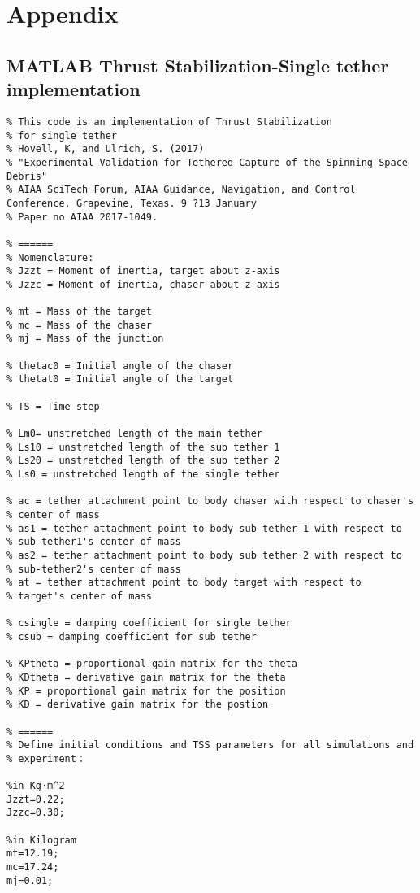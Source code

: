 \chapter{Appendix}\label{section-appendix} 
\section{MATLAB Thrust Stabilization-Single tether implementation}
\begin{lstlisting}
% This code is an implementation of Thrust Stabilization
% for single tether
% Hovell, K, and Ulrich, S. (2017)
% "Experimental Validation for Tethered Capture of the Spinning Space Debris"
% AIAA SciTech Forum, AIAA Guidance, Navigation, and Control Conference, Grapevine, Texas. 9 ?13 January
% Paper no AIAA 2017-1049.

% ======
% Nomenclature:
% Jzzt = Moment of inertia, target about z-axis 
% Jzzc = Moment of inertia, chaser about z-axis

% mt = Mass of the target
% mc = Mass of the chaser
% mj = Mass of the junction

% thetac0 = Initial angle of the chaser 
% thetat0 = Initial angle of the target

% TS = Time step

% Lm0= unstretched length of the main tether
% Ls10 = unstretched length of the sub tether 1
% Ls20 = unstretched length of the sub tether 2
% Ls0 = unstretched length of the single tether

% ac = tether attachment point to body chaser with respect to chaser's
% center of mass
% as1 = tether attachment point to body sub tether 1 with respect to
% sub-tether1's center of mass
% as2 = tether attachment point to body sub tether 2 with respect to
% sub-tether2's center of mass
% at = tether attachment point to body target with respect to
% target's center of mass

% csingle = damping coefficient for single tether
% csub = damping coefficient for sub tether

% KPtheta = proportional gain matrix for the theta 
% KDtheta = derivative gain matrix for the theta
% KP = proportional gain matrix for the position
% KD = derivative gain matrix for the postion

% ======
% Define initial conditions and TSS parameters for all simulations and
% experiment：

%in Kg·m^2
Jzzt=0.22; 
Jzzc=0.30; 

%in Kilogram
mt=12.19; 
mc=17.24; 
mj=0.01;


\end{lstlisting}
